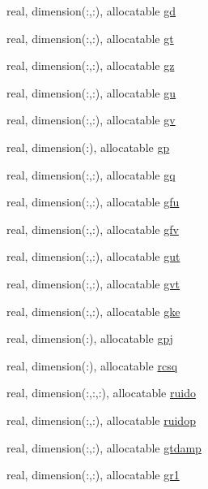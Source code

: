 \begin{DoxyCompactItemize}
\item 
real, dimension(\-:,\-:), allocatable \hyperlink{classpumamod_a50103ebf2d2ba2366f2eca07abaabeb4}{gd}
\item 
real, dimension(\-:,\-:), allocatable \hyperlink{classpumamod_a3001f3699640a16cd7f91c6aa528af16}{gt}
\item 
real, dimension(\-:,\-:), allocatable \hyperlink{classpumamod_af24b389b45d2a20b68ea5bfc7cc48d17}{gz}
\item 
real, dimension(\-:,\-:), allocatable \hyperlink{classpumamod_aaed48b35d778e5c3095fcd1083bbe804}{gu}
\item 
real, dimension(\-:,\-:), allocatable \hyperlink{classpumamod_a88b0140b2435578aa69cb4ac9781b91c}{gv}
\item 
real, dimension(\-:), allocatable \hyperlink{classpumamod_a6626db807402c61328ae36fddbeec5f1}{gp}
\item 
real, dimension(\-:,\-:), allocatable \hyperlink{classpumamod_a562c8285b90afd93ee2add1099a55e0f}{gq}
\item 
real, dimension(\-:,\-:), allocatable \hyperlink{classpumamod_aee702bf92e2a4578e4ff0adbdafcaadb}{gfu}
\item 
real, dimension(\-:,\-:), allocatable \hyperlink{classpumamod_a3398d85c059c2cbe3948907b12a9058e}{gfv}
\item 
real, dimension(\-:,\-:), allocatable \hyperlink{classpumamod_a54c30e8bd1e5b308c4111eaac995f578}{gut}
\item 
real, dimension(\-:,\-:), allocatable \hyperlink{classpumamod_a1b9d24404ad1e089ee401e7c00ec79f0}{gvt}
\item 
real, dimension(\-:,\-:), allocatable \hyperlink{classpumamod_a9c3f9d77d6c9acc5e900cb8fce8f8ac3}{gke}
\item 
real, dimension(\-:), allocatable \hyperlink{classpumamod_add5a9e2d129fa1c8bfe199f84263c9f7}{gpj}
\item 
real, dimension(\-:), allocatable \hyperlink{classpumamod_a1102b7714ee109056cd4b64bb9ba96e4}{rcsq}
\item 
real, dimension(\-:,\-:,\-:), allocatable \hyperlink{classpumamod_a631f8bc1450b1c083f26a35cab8d87cc}{ruido}
\item 
real, dimension(\-:,\-:), allocatable \hyperlink{classpumamod_a839f7aa31c37072113405a43e334292e}{ruidop}
\item 
real, dimension(\-:,\-:), allocatable \hyperlink{classpumamod_a697a2f43424ec02c33ad0e069f60edd2}{gtdamp}
\item 
real, dimension(\-:,\-:), allocatable \hyperlink{classpumamod_a550fb7dbedcb399eeee029f09e0261c7}{gr1}

\end{DoxyCompactItemize}
